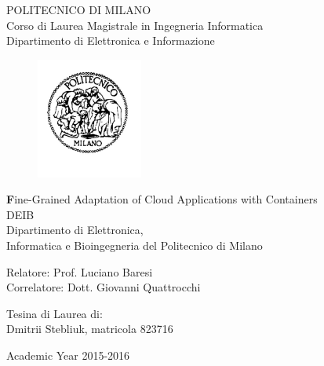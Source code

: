 \thispagestyle{empty}
\vspace*{-1.5cm} \bfseries{
\begin{center}
  \large
  POLITECNICO DI MILANO\\
  \normalsize
  Corso di Laurea Magistrale in Ingegneria Informatica\\
  Dipartimento di Elettronica e Informazione\\
  \begin{figure}[htbp]
    \begin{center}
      \includegraphics[width=3.5cm]{./pictures/logopm}
    \end{center}
  \end{figure}
  \vspace*{0.3cm} \LARGE

  \textbf Fine-Grained Adaptation of Cloud Applications with Containers\\

  \vspace*{.75truecm} \large
  DEIB \\
  Dipartimento di Elettronica,   \\
  Informatica e Bioingegneria del Politecnico di Milano
\end{center}
\vspace*{3.0cm} \large
\begin{flushleft}


  Relatore: Prof. Luciano Baresi \\
  Correlatore: Dott. Giovanni Quattrocchi 

\end{flushleft}
\vspace*{1.0cm}
\begin{flushright}


  Tesina di Laurea di:\\ Dmitrii Stebliuk, matricola 823716 \\ 


\end{flushright}
\vspace*{0.5cm}
\begin{center}



  Academic Year 2015-2016
\end{center} \clearpage
}
